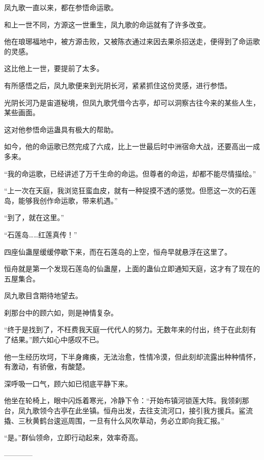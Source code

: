 \begin{this_body}
凤九歌一直以来，都在参悟命运歌。

和上一世不同，方源这一世重生，凤九歌的命运就有了许多改变。

他在琅琊福地中，被方源击败，又被陈衣通过来因去果杀招送走，便得到了命运歌的灵感。

这比他上一世，要提前了太多。

有所感悟之后，凤九歌便来到光阴长河，紧紧抓住这份灵感，进行参悟。

光阴长河乃是宙道秘境，但凤九歌凭借今古亭，却可以洞察古往今来的某些人生，某些画面。

这对他参悟命运蛊具有极大的帮助。

如今，他的命运歌已然完成了六成，比上一世最后时中洲宿命大战，还要高出一成多来。

“我的命运歌，已经讲述了万千生命的命运。但尊者的命运，却都不能尽情描绘。”

“上一次在天庭，我浏览狂蛮血皮，就有一种捉摸不透的感觉。但愿这一次的石莲岛，能够我创作命运歌，带来机遇。”

“到了，就在这里。”

“石莲岛……红莲真传！”

四座仙蛊屋缓缓停歇下来，而在石莲岛的上空，恒舟早就悬浮在这里了。

恒舟就是第一个发现石莲岛的仙蛊屋，上面的蛊仙立即通知天庭，这才有了现在的五屋集合。

凤九歌目含期待地望去。

刹那台中的顾六如，则是神情复杂。

“终于是找到了，不枉费我天庭一代代人的努力。无数年来的付出，终于在此刻有了结果。”顾六如心中感叹不已。

他一生经历坎坷，下半身瘫痪，无法治愈，性情冷漠，但此刻却流露出种种情怀，有激动，有骄傲，有酸楚。

深呼吸一口气，顾六如已彻底平静下来。

他坐在轮椅上，眼中闪烁着寒光，冷静下令：“开始布镇河锁莲大阵。我领刹那台，凤九歌领今古亭在此坐镇。恒舟出发，去往支流河口，接引我方援兵。鲨流撬、三秋黄鹤台逡巡周围，一旦有什么风吹草动，务必立即向我汇报。”

“是。”群仙领命，立即行动起来，效率奇高。

------------

\end{this_body}

